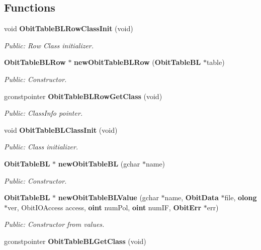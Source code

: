 \subsection*{Functions}
\begin{CompactItemize}
\item 
void {\bf Obit\-Table\-BLRow\-Class\-Init} (void)
\begin{CompactList}\small\item\em Public: Row Class initializer. \item\end{CompactList}\item 
{\bf Obit\-Table\-BLRow} $\ast$ {\bf new\-Obit\-Table\-BLRow} ({\bf Obit\-Table\-BL} $\ast$table)
\begin{CompactList}\small\item\em Public: Constructor. \item\end{CompactList}\item 
gconstpointer {\bf Obit\-Table\-BLRow\-Get\-Class} (void)
\begin{CompactList}\small\item\em Public: Class\-Info pointer. \item\end{CompactList}\item 
void {\bf Obit\-Table\-BLClass\-Init} (void)
\begin{CompactList}\small\item\em Public: Class initializer. \item\end{CompactList}\item 
{\bf Obit\-Table\-BL} $\ast$ {\bf new\-Obit\-Table\-BL} (gchar $\ast$name)
\begin{CompactList}\small\item\em Public: Constructor. \item\end{CompactList}\item 
{\bf Obit\-Table\-BL} $\ast$ {\bf new\-Obit\-Table\-BLValue} (gchar $\ast$name, {\bf Obit\-Data} $\ast$file, {\bf olong} $\ast$ver, Obit\-IOAccess access, {\bf oint} num\-Pol, {\bf oint} num\-IF, {\bf Obit\-Err} $\ast$err)
\begin{CompactList}\small\item\em Public: Constructor from values. \item\end{CompactList}\item 
gconstpointer {\bf Obit\-Table\-BLGet\-Class} (void)

\end{CompactItemize}
